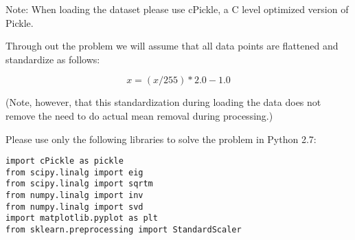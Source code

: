 Note: When loading the dataset please use cPickle, a C level optimized version of Pickle. 


Through out the problem we will assume that all data points are flattened and standardize as follows: 

$$x = (x/255)*2.0 - 1.0$$

(Note, however, that this standardization during loading the data does
not remove the need to do actual mean removal during processing.) 

Please use only the following libraries to solve the problem in Python 2.7:

\begin{lstlisting}
import cPickle as pickle
from scipy.linalg import eig
from scipy.linalg import sqrtm
from numpy.linalg import inv
from numpy.linalg import svd
import matplotlib.pyplot as plt
from sklearn.preprocessing import StandardScaler
\end{lstlisting}



